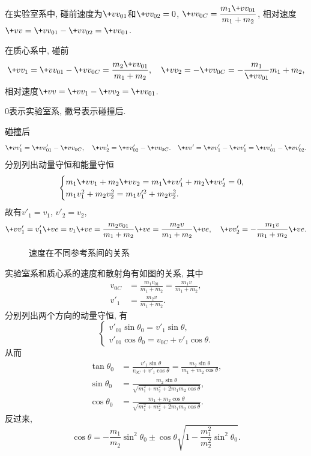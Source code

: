 \documentclass{ctexart}
\begin{document}
\par
在实验室系中, 碰前速度为$\+vv_{01}$和$\+vv_{02} = 0$, $\displaystyle \+vv_{0C} = \frac{m_1 \+vv_{01}}{m_1 + m_2}$, 相对速度$\+vv = \+vv_{01} - \+vv_{02} = \+vv_{01}$.
\par
在质心系中, 碰前
\[ \+vv_1 = \+vv_{01} - \+vv_{0C} = \frac{m_2 \+vv_{01}}{m_1+m_2},\quad \+vv_2 = -\+vv_{0C} = -\frac{m_1}{\+vv_{01}}{m_1+m_2}, \]
相对速度$\+vv = \+vv_1 - \+vv_2 = \+vv_{01}$.
\begin{remark}
    $0$表示实验室系, 撇号表示碰撞后.
\end{remark}
碰撞后
\[ \+vv_1' = \+vv'_{01} - \+vv_{0C},\quad \+vv_2' = \+vv_{02}' - \+vv_{0C}.\quad \+vv' = \+vv'_1 - \+vv'_1 = \+vv'_{01} - \+vv'_{02}. \]
分别列出动量守恒和能量守恒
\[ \begin{cases}
    m_1 \+vv_1 + m_2 \+vv_2 = m_1 \+vv'_1 + m_2 \+vv'_2 = 0,\\
    m_1 v_1^2 + m_2v_2^2 = m_1 v'^2_1 + m_2 v^2_2.
\end{cases} \]
故有$v'_1 = v_1$, $v'_2 = v_2$,
\[ \+vv'_1 = v'_1\+ve = v_1 \+ve = \frac{m_2 v_{01}}{m_1+m_2}\+ve = \frac{m_2 v}{m_1+m_2}\+ve,\quad \+vv'_2 = -\frac{m_1 v}{m_1+m_2}\+ve. \]
\begin{figure}[ht]
    \centering
    \caption{速度在不同参考系间的关系}
    \label{fig:速度在不同参考系间的关系}
\end{figure}
实验室系和质心系的速度和散射角有如图的关系, 其中
\begin{align*}
    v_{0C} &= \frac{m_1 v_{01}}{m_1+m_2} = \frac{m_1 v}{m_1 + m_2}, \\
    v'_1 &= \frac{m_2 v}{m_1+m_2}.
\end{align*}
分别列出两个方向的动量守恒, 有
\[ \begin{cases}
    v'_{01} \sin\theta_0 = v'_1\sin\theta, \\
    v'_{01}\cos\theta_0 = v_{0C} + v'_1\cos\theta.
\end{cases} \]
从而
\begin{align*}
    \tan \theta_0 &= \frac{v'_1 \sin\theta}{v_{0C} + v'_1\cos\theta} = \frac{m_2\sin\theta}{m_1 + m_2\cos\theta}, \\
    \sin\theta_0 &= \frac{m_2 \sin\theta}{\sqrt{m_1^2+m_2^2+2m_1m_2\cos\theta}}, \\
    \cos\theta_0 &= \frac{m_1 + m_2\cos\theta}{\sqrt{m_1^2+m_2^2+2m_1m_2\cos\theta}}.
\end{align*}
反过来,
\begin{equation}
    \label{eq:实验室系和质心系的theta关系}
    \cos\theta = -\frac{m_1}{m_2}\sin^2\theta_0 \pm \cos\theta \sqrt{1 - \frac{m_1^2}{m_2^2}\sin^2\theta_0}.
\end{equation}
\end{document}

